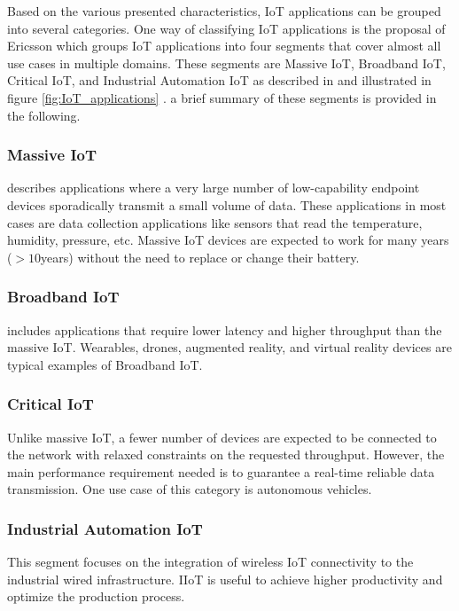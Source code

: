 \documentclass[]{IEEEtran}
\begin{document}
Based on the various presented characteristics, IoT applications can be grouped into several categories. One way of classifying IoT applications is the proposal of Ericsson which groups IoT applications into four segments that cover almost all use cases in multiple domains. These segments are Massive IoT, Broadband IoT, Critical IoT, and Industrial Automation IoT as described in \cite{kuhlins_cellular_2020} and illustrated in figure \ref{fig:IoT_applications} \cite{zaidi_cellular_2020}. a brief summary of these segments is provided in the following.

\subsubsection*{Massive IoT} describes applications where a very large number of low-capability endpoint devices sporadically transmit a small volume of data. These applications in most cases are data collection applications like sensors that read the temperature, humidity, pressure, etc. Massive IoT devices are expected to work for many years ($>10$years) without the need to replace or change their battery.

\subsubsection*{Broadband IoT} includes applications that require lower latency and higher throughput than the massive IoT. Wearables, drones, augmented reality, and virtual reality devices 
are typical examples of Broadband IoT.

\subsubsection*{Critical IoT} Unlike massive IoT, a fewer number of devices are expected to be connected to the network with relaxed constraints on the requested throughput. However, the main performance requirement needed is to guarantee a real-time reliable data transmission. One use case of this category is autonomous vehicles.

\subsubsection*{Industrial Automation IoT} This segment focuses on the integration of wireless IoT connectivity to the industrial wired infrastructure. IIoT is useful to achieve higher productivity and optimize the production process.
\end{document}
